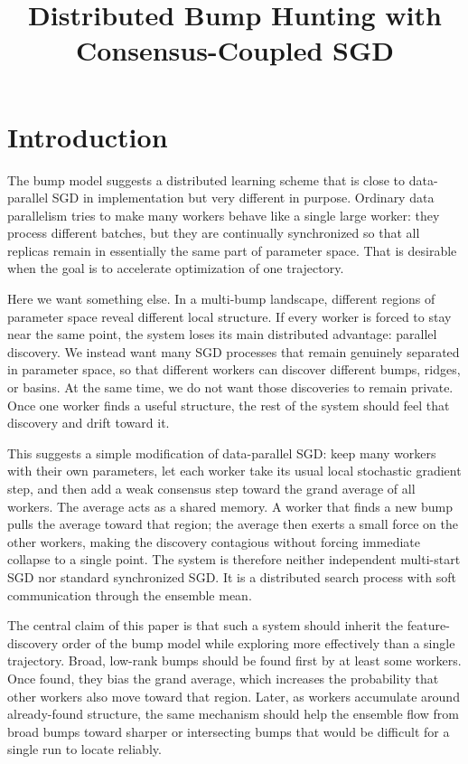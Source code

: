 \documentclass{article}
\title{Distributed Bump Hunting with Consensus-Coupled SGD}
\author{}
\date{}
\begin{document}
\maketitle

\section{Introduction}

The bump model suggests a distributed learning scheme that is close to
data-parallel SGD in implementation but very different in purpose.
Ordinary data parallelism tries to make many workers behave like a
single large worker: they process different batches, but they are
continually synchronized so that all replicas remain in essentially the
same part of parameter space. That is desirable when the goal is to
accelerate optimization of one trajectory.

Here we want something else. In a multi-bump landscape, different
regions of parameter space reveal different local structure. If every
worker is forced to stay near the same point, the system loses its main
distributed advantage: parallel discovery. We instead want many SGD
processes that remain genuinely separated in parameter space, so that
different workers can discover different bumps, ridges, or basins. At
the same time, we do not want those discoveries to remain private. Once
one worker finds a useful structure, the rest of the system should feel
that discovery and drift toward it.

This suggests a simple modification of data-parallel SGD: keep many
workers with their own parameters, let each worker take its usual local
stochastic gradient step, and then add a weak consensus step toward the
grand average of all workers. The average acts as a shared memory. A
worker that finds a new bump pulls the average toward that region; the
average then exerts a small force on the other workers, making the
discovery contagious without forcing immediate collapse to a single
point. The system is therefore neither independent multi-start SGD nor
standard synchronized SGD. It is a distributed search process with soft
communication through the ensemble mean.

The central claim of this paper is that such a system should inherit the
feature-discovery order of the bump model while exploring more
effectively than a single trajectory. Broad, low-rank bumps should be
found first by at least some workers. Once found, they bias the grand
average, which increases the probability that other workers also move
toward that region. Later, as workers accumulate around already-found
structure, the same mechanism should help the ensemble flow from broad
bumps toward sharper or intersecting bumps that would be difficult for a
single run to locate reliably.
\end{document}
